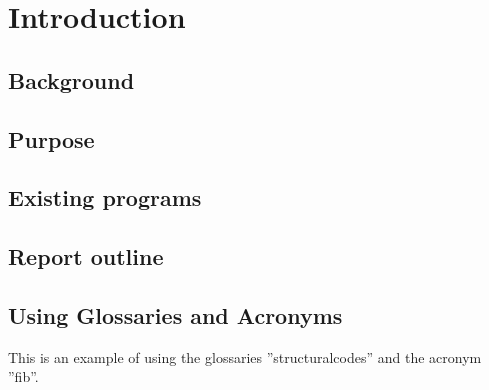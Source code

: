 \chapter{Introduction}

\section{Background}

\section{Purpose}

\section{Existing programs}

\section{Report outline}

\section{Using Glossaries and Acronyms}
This is an example of using the glossaries ''\gls{structuralcodes}'' and the acronym ''\acrshort{fib}''. 
